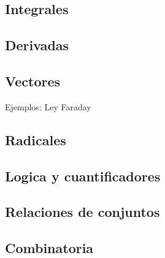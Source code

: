 \documentclass[../notes.tex]{subfiles}
\begin{document}
        \subsection{Integrales}
        \subsection{Derivadas}
        \subsection{Vectores}
            Ejemplos: Ley Faraday
    
        \subsection{Radicales}
        
        \subsection{Logica y cuantificadores}
        
        \subsection{Relaciones de conjuntos}
        
        \subsection{Combinatoria} 
        
\end{document}
